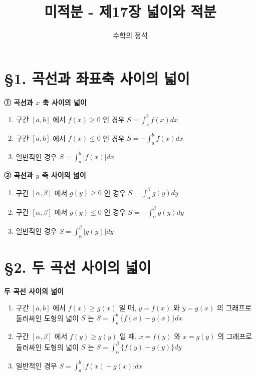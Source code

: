 \documentclass[a4paper,11pt]{article}
\title{\textbf{미적분 - 제17장 넓이와 적분}}
\author{수학의 정석}
\date{}
\begin{document}
\maketitle

\section*{§1. 곡선과 좌표축 사이의 넓이}

\begin{conceptbox}[기본 정석]
\textbf{① 곡선과 $x$ 축 사이의 넓이}
\begin{enumerate}[label=(\text{\roman*})]
    \item 구간 $[a, b]$ 에서 $f(x) \ge 0$ 인 경우 $S = \int_{a}^{b} f(x) dx$
    \item 구간 $[a, b]$ 에서 $f(x) \le 0$ 인 경우 $S = -\int_{a}^{b} f(x) dx$
    \item 일반적인 경우 $S = \int_{a}^{b} |f(x)| dx$
\end{enumerate}
\textbf{② 곡선과 $y$ 축 사이의 넓이}
\begin{enumerate}[label=(\text{\roman*})]
    \item 구간 $[\alpha, \beta]$ 에서 $g(y) \ge 0$ 인 경우 $S = \int_{\alpha}^{\beta} g(y) dy$
    \item 구간 $[\alpha, \beta]$ 에서 $g(y) \le 0$ 인 경우 $S = -\int_{\alpha}^{\beta} g(y) dy$
    \item 일반적인 경우 $S = \int_{\alpha}^{\beta} |g(y)| dy$
\end{enumerate}
\end{conceptbox}

\section*{§2. 두 곡선 사이의 넓이}

\begin{conceptbox}[기본 정석]
\textbf{두 곡선 사이의 넓이}
\begin{enumerate}[label=(\arabic*)]
    \item 구간 $[a, b]$ 에서 $f(x) \ge g(x)$ 일 때, $y=f(x)$ 와 $y=g(x)$ 의 그래프로 둘러싸인 도형의 넓이 $S$ 는 $S = \int_a^b \{f(x) - g(x)\} dx$
    \item 구간 $[\alpha, \beta]$ 에서 $f(y) \ge g(y)$ 일 때, $x=f(y)$ 와 $x=g(y)$ 의 그래프로 둘러싸인 도형의 넓이 $S$ 는 $S = \int_{\alpha}^{\beta} \{f(y) - g(y)\} dy$
    \item 일반적인 경우 $S = \int_a^b |f(x) - g(x)| dx$
\end{enumerate}
\end{conceptbox}
\end{document}
